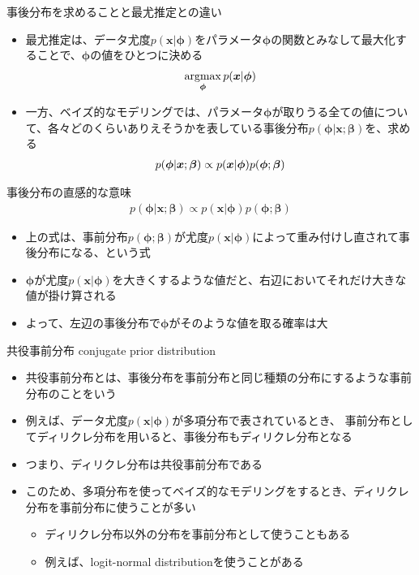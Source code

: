 \documentclass[aspectratio=169,unicode,dvipdfmx,14pt]{beamer}
\begin{document}
\begin{frame}{事後分布を求めることと最尤推定との違い}
\begin{itemize}
\item 最尤推定は、データ尤度$p(\bm{x}|\bm{\phi})$をパラメータ$\bm{\phi}$の関数とみなして最大化することで、$\bm{\phi}$の値をひとつに決める
\begin{align}
\operatorname*{argmax}_{\bm{\phi}} p(\bm{x}|\bm{\phi})
\notag
\end{align}
\item 一方、ベイズ的なモデリングでは、パラメータ$\bm{\phi}$が取りうる全ての値について、各々どのくらいありえそうかを表している事後分布$p(\bm{\phi}|\bm{x};\bm{\beta})$を、求める
\begin{align}
p(\bm{\phi}|\bm{x};\bm{\beta}) \propto p(\bm{x}|\bm{\phi})p(\bm{\phi};\bm{\beta})
\notag
\end{align}
\end{itemize}
\end{frame}

\begin{frame}{事後分布の直感的な意味}
\vspace{-.2in}
\begin{align}
p(\bm{\phi}|\bm{x};\bm{\beta}) \propto p(\bm{x}|\bm{\phi})p(\bm{\phi};\bm{\beta})
\end{align}
\vspace{-.2in}
\begin{itemize}
\item 上の式は、事前分布$p(\bm{\phi};\bm{\beta})$が尤度$p(\bm{x}|\bm{\phi})$によって重み付けし直されて事後分布になる、という式
\item $\bm{\phi}$が尤度$p(\bm{x}|\bm{\phi})$を大きくするような値だと、右辺においてそれだけ大きな値が掛け算される
\item よって、左辺の事後分布で$\bm{\phi}$がそのような値を取る確率は大
\end{itemize}
\end{frame}

\begin{frame}{共役事前分布 conjugate prior distribution}
\begin{itemize}
\item 共役事前分布とは、事後分布を事前分布と同じ種類の分布にするような事前分布のことをいう
\item 例えば、データ尤度$p(\bm{x}|\bm{\phi})$が多項分布で表されているとき、
事前分布としてディリクレ分布を用いると、事後分布もディリクレ分布となる
\item つまり、ディリクレ分布は共役事前分布である
\item このため、多項分布を使ってベイズ的なモデリングをするとき、ディリクレ分布を事前分布に使うことが多い
\begin{itemize}
\item ディリクレ分布以外の分布を事前分布として使うこともある
\item 例えば、logit-normal distributionを使うことがある
\end{itemize}
\end{itemize}
\end{frame}
\end{document}
